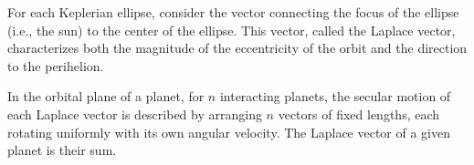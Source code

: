 For each Keplerian ellipse, consider the vector connecting the focus of the ellipse (i.e., the sun) to the center of the ellipse. This vector, called the Laplace vector, characterizes both the magnitude of the eccentricity of the orbit and the direction to the perihelion.

In the orbital plane of a planet, for $n$ interacting planets, the secular motion of each Laplace vector is described by arranging $n$ vectors of fixed lengths, each rotating uniformly with its own angular velocity. The Laplace vector of a given planet is their sum.
